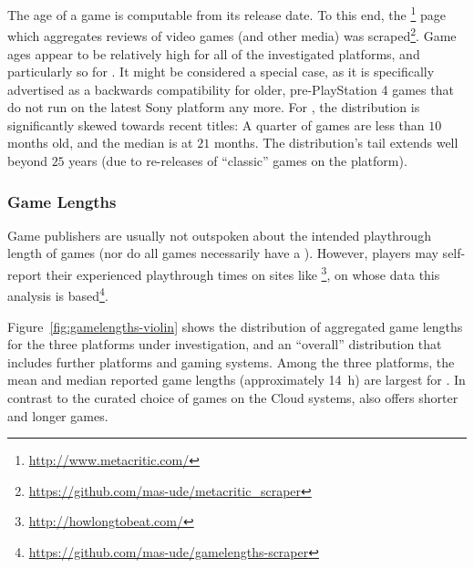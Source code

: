 The age of a game is computable from its release date. To this end, the
\metacritic\footnote{\url{http://www.metacritic.com/}} page which
aggregates reviews of video games (and other media) was
scraped\footnote{\url{https://github.com/mas-ude/metacritic_scraper}}.
Game ages appear to be relatively high for all of the investigated
platforms, and particularly so for \psnow. It might be considered a
special case, as it is specifically advertised as a backwards
compatibility for older, pre-PlayStation 4 games that do not run on the
latest Sony platform any more. For \steam, the distribution is
significantly skewed towards recent titles: A quarter of games are less
than $10$ months old, and the median is at $21$ months. The
distribution's tail extends well beyond $25$ years (due to re-releases
of ``classic'' games on the platform).


\subsubsection{Game Lengths}

Game publishers are usually not outspoken about the intended playthrough
length of games (nor do all games necessarily have a ). However, players
may self-report their experienced playthrough times on sites like
\hltb\footnote{\url{http://howlongtobeat.com/}}, on whose data this
analysis is
based\footnote{\url{https://github.com/mas-ude/gamelengths-scraper}}.

Figure~\ref{fig:gamelengths-violin} shows the distribution of aggregated
game lengths for the three platforms under investigation, and an
``overall'' distribution that includes further platforms and gaming
systems. Among the three platforms, the mean and median reported game
lengths (approximately \SI{14}{\hour}) are largest for \gfnow. In
contrast to the curated choice of games on the Cloud systems, \steam
also offers shorter and longer games.


